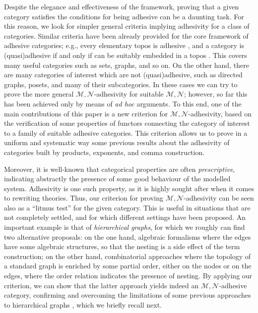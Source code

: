 \documentclass[runningheads,envcountsect]{lmcs}
\theoremstyle{plain}
\theoremstyle{definition}
\begin{document}
Despite the elegance and effectiveness of the framework, proving that a given category satisfies the conditions for being adhesive can be a daunting task. 
For this reason, we look for simpler general criteria implying adhesivity for a class of categories.
Similar criteria have been already provided for the core framework of adhesive categories; e.g., every elementary topos is adhesive \cite{lack2006toposes}, and a category is (quasi)adhesive if and only if can be suitably embedded in a topos \cite{johnstone2007quasitoposes,garner2012axioms}. This covers many useful categories such as sets, graphs, and so on. On the other hand, there are many categories of interest which are not (quasi)adhesive, such as directed graphs, posets, and many of their subcategories.  In these cases we can try to prove the more general $\mathcal{M}, \mathcal{N}$-adhesivity for suitable $\mathcal{M}, \mathcal{N}$; however, so far this has been achieved only by means of \emph{ad hoc} arguments. %
To this end, one of the main contributions of this paper is a new criterion for $\mathcal{M}, \mathcal{N}$-adhesivity, based on the verification of some properties of functors connecting the category of interest to a family of suitable adhesive categories. This criterion allows us to prove in a uniform and systematic way some previous results about the adhesivity of categories built by products, exponents, and comma construction.

Moreover, it is well-known that categorical properties are often \emph{prescriptive}, indicating abstractly the presence of some good behaviour of the modelled system. Adhesivity is one such property, as it is highly sought after when it comes to rewriting theories. Thus, our criterion for proving $\mathcal{M}, \mathcal{N}$-adhesivity can be seen also as a ``litmus test'' for the given category.
This is useful in situations that are not completely settled, and for which different settings have been proposed.
An important example is that of \emph{hierarchical graphs}, for which we roughly can find two alternative proposals: on the one hand, algebraic formalisms where the edges have some algebraic structures, so that the nesting is a side effect of the term construction; on the other hand, combinatorial approaches where the topology of a standard graph is enriched by some partial order, either on the nodes or on the edges, where the order relation indicates the presence of nesting. 
By applying our criterion, we can show that the latter approach yields indeed an $\mathcal{M}, \mathcal{N}$-adhesive category, confirming and overcoming the limitations of some previous approaches to hierarchical graphs \cite{nyko2012,Padberg17,palacz2004algebraic}, which we briefly recall next.
\end{document}
